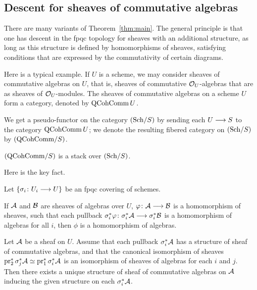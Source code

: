 \begin{4   STACKS}
\begin{4.2 Descent for quasi-coherent sheaves}
\subsection{Descent for sheaves of commutative algebras}

There are many variants of Theorem~\ref{thm:main}. The general principle is that one has descent in the fpqc topology for \qc sheaves with an additional structure, as long as this structure is defined by homomorphisms of sheaves, satisfying conditions that are expressed by the commutativity of certain diagrams.

Here is a typical example. If $U$ is a scheme, we may consider \qc sheaves of commutative algebras on $U$, that is, sheaves of commutative $\mathcal{O}_U$-algebras that are \qc as sheaves of $\mathcal{O}_U$-modules. The \qc sheaves of commutative algebras on a scheme $U$ form a category, denoted by $\operatorname{QCohComm} U$.


We get a pseudo-functor on the category $({\mathrm{Sch}/S})$ by sending each $U \arr S$ to the category $\operatorname{QCohComm} U$; we denote the resulting fibered category on $({\mathrm{Sch}/S})$ by $({\mathrm{QCohComm}/S})$.

\begin{theorem}\label{thm:algebras-stack}
$({\mathrm{QCohComm}/S})$ is a stack over $({\mathrm{Sch}/S})$.
\end{theorem}

Here is the key fact.

\begin{lemma} 
Let $\{\sigma_i \colon U_i \arr U\}$ be an fpqc covering of schemes.
\begin{enumeratei}

 If $\mathcal{A}$ and $\mathcal{B}$ are \qc sheaves of algebras over $U$, $\phi \colon \cA \arr \cB$ is a homomorphism of \qc sheaves, such that each pullback $\sigma_i^* \phi \colon \sigma_i^* \cA \arr \sigma_i^* \cB$ is a homomorphism of algebras for all $i$, then $\phi$ is a homomorphism of algebras.

 Let $\mathcal{A}$ be a \qc sheaf on $U$. Assume that each pullback $\sigma_i^* \mathcal{A}$ has a structure of sheaf of commutative algebras, and that the canonical isomorphism of \qc sheaves $\operatorname{pr}_2^* \sigma_j^* \mathcal{A} \simeq \operatorname{pr}_1^* \sigma_i^* \mathcal{A}$ is an isomorphism of sheaves of algebras for each $i$ and $j$. Then there exists a unique structure of sheaf of commutative algebras on $\mathcal{A}$ inducing the given structure on each $\sigma_i^*\mathcal{A}$.


\end{enumeratei}
\end{lemma}
\end{4.2 Descent for quasi-coherent sheaves}
\end{4   STACKS}
